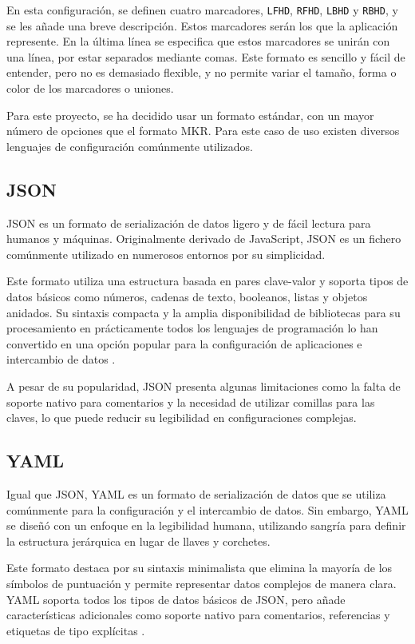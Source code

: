 En esta configuración, se definen cuatro marcadores, \texttt{LFHD}, \texttt{RFHD}, \texttt{LBHD} y \texttt{RBHD}, y se les añade una breve descripción. Estos marcadores serán los que la aplicación represente. En la última línea se especifica que estos marcadores se unirán con una línea, por estar separados mediante comas. Este formato es sencillo y fácil de entender, pero no es demasiado flexible, y no permite variar el tamaño, forma o color de los marcadores o uniones.

Para este proyecto, se ha decidido usar un formato estándar, con un mayor número de opciones que el formato MKR. Para este caso de uso existen diversos lenguajes de configuración comúnmente utilizados.

\subsection{\acs{JSON}}

\ac{JSON} es un formato de serialización de datos ligero y de fácil lectura para humanos y máquinas. Originalmente derivado de JavaScript, \ac{JSON} es un fichero comúnmente utilizado en numerosos entornos por su simplicidad.

Este formato utiliza una estructura basada en pares clave-valor y soporta tipos de datos básicos como números, cadenas de texto, booleanos, listas y objetos anidados. Su sintaxis compacta y la amplia disponibilidad de bibliotecas para su procesamiento en prácticamente todos los lenguajes de programación lo han convertido en una opción popular para la configuración de aplicaciones e intercambio de datos \autocite{ECMA404}.

A pesar de su popularidad, \ac{JSON} presenta algunas limitaciones como la falta de soporte nativo para comentarios y la necesidad de utilizar comillas para las claves, lo que puede reducir su legibilidad en configuraciones complejas.

\subsection{\acs{YAML}}

Igual que \ac{JSON}, \ac{YAML} es un formato de serialización de datos que se utiliza comúnmente para la configuración y el intercambio de datos. Sin embargo, \ac{YAML} se diseñó con un enfoque en la legibilidad humana, utilizando sangría para definir la estructura jerárquica en lugar de llaves y corchetes.

Este formato destaca por su sintaxis minimalista que elimina la mayoría de los símbolos de puntuación y permite representar datos complejos de manera clara. \ac{YAML} soporta todos los tipos de datos básicos de \ac{JSON}, pero añade características adicionales como soporte nativo para comentarios, referencias y etiquetas de tipo explícitas \autocite{YAMLAintMarkup}.

